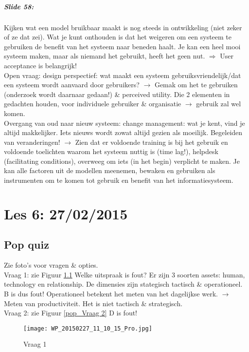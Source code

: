 \documentclass[10pt,a4paper]{report}
\begin{document}
\paragraph{Slide 58:}Kijken wat een model bruikbaar maakt is nog steeds in ontwikkeling (niet zeker of ze dat zei). Wat je kunt onthouden is dat het weigeren om een systeem te gebruiken de benefit van het systeem naar beneden haalt. Je kan een heel mooi systeem maken, maar als niemand het gebruikt, heeft het geen nut. $\Rightarrow$ User acceptance is belangrijk!\\
Open vraag: design perspectief: wat maakt een systeem gebruiksvriendelijk/dat een systeem wordt aanvaard door gebruikers? $\rightarrow$ Gemak om het te gebruiken (onderzoek wordt daarnaar gedaan!) \& perceived utility. Die 2 elementen in gedachten houden, voor individuele gebruiker \& organisatie $\rightarrow$ gebruik zal wel komen.\\
Overgang van oud naar nieuw systeem: change management: wat je kent, vind je altijd makkelijker. Iets nieuws wordt zowat altijd gezien als moeilijk. Begeleiden van veranderingen! $\rightarrow$ Zien dat er voldoende training is bij het gebruik en voldoende toelichten waarom het systeem nuttig is (time lag!), helpdesk (facilitating conditions), overweeg om iets (in het begin) verplicht te maken.
Je kan alle factoren uit de modellen meenemen, bewaken en gebruiken als instrumenten om te komen tot gebruik en benefit van het informatiesysteem.

\chapter{Les 6: 27/02/2015}
\section{Pop quiz}
Zie foto's voor vragen \& opties.\\
Vraag 1: zie Figuur \ref{pop_Vraag 1}
Welke uitspraak is fout? Er zijn 3 soorten assets: human, technology en relationship. De dimensies zijn stategisch tactisch \& operationeel. B is dus fout! Operationeel betekent het meten van het dagelijkse werk. $\rightarrow$ Meten van productiviteit. Het is niet tactisch \& strategisch.\\
Vraag 2: zie Figuur \ref{pop_Vraag 2}
D is fout! 

\begin{figure}[ht!]
\centering
\texttt{[image: WP\_20150227\_11\_10\_15\_Pro.jpg]}
\caption{Vraag 1 \label{pop_Vraag 1}}
\end{figure}
\end{document}
